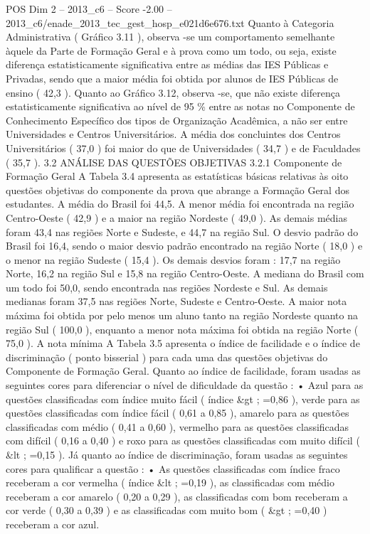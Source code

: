 \begin{textsample}{POS Dim 2 – 2013\_c6 – Score -2.00 – 2013\_c6/enade\_2013\_tec\_gest\_hosp\_e021d6e676.txt}
Quanto à Categoria Administrativa ( Gráfico 3.11 ), observa -se um comportamento semelhante àquele da Parte de Formação Geral e à prova como um todo, ou seja, existe diferença estatisticamente significativa entre as médias das IES Públicas e Privadas, sendo que a maior média foi obtida por alunos de IES Públicas de ensino ( 42,3 ).
Quanto ao Gráfico 3.12, observa -se, que não existe diferença estatisticamente significativa ao nível de 95 \% entre as notas no Componente de Conhecimento Específico dos tipos de Organização Acadêmica, a não ser entre Universidades e Centros Universitários.
A média dos concluintes dos Centros Universitários ( 37,0 ) foi maior do que de Universidades ( 34,7 ) e de Faculdades ( 35,7 ). 3.2 ANÁLISE DAS QUESTÕES OBJETIVAS 3.2.1 Componente de Formação Geral A Tabela 3.4 apresenta as estatísticas básicas relativas às oito questões objetivas do componente da prova que abrange a Formação Geral dos estudantes.
A média do Brasil foi 44,5.
A menor média foi encontrada na região Centro-Oeste ( 42,9 ) e a maior na região Nordeste ( 49,0 ).
As demais médias foram 43,4 nas regiões Norte e Sudeste, e 44,7 na região Sul.
O desvio padrão do Brasil foi 16,4, sendo o maior desvio padrão encontrado na região Norte ( 18,0 ) e o menor na região Sudeste ( 15,4 ).
Os demais desvios foram : 17,7 na região Norte, 16,2 na região Sul e 15,8 na região Centro-Oeste.
A mediana do Brasil com um todo foi 50,0, sendo encontrada nas regiões Nordeste e Sul.
As demais medianas foram 37,5 nas regiões Norte, Sudeste e Centro-Oeste.
A maior nota máxima foi obtida por pelo menos um aluno tanto na região Nordeste quanto na região Sul ( 100,0 ), enquanto a menor nota máxima foi obtida na região Norte ( 75,0 ).
A nota mínima A Tabela 3.5 apresenta o índice de facilidade e o índice de discriminação ( ponto bisserial ) para cada uma das questões objetivas do Componente de Formação Geral.
Quanto ao índice de facilidade, foram usadas as seguintes cores para diferenciar o nível de dificuldade da questão : • Azul para as questões classificadas com índice muito fácil ( índice \&gt ; =0,86 ), verde para as questões classificadas com índice fácil ( 0,61 a 0,85 ), amarelo para as questões classificadas com médio ( 0,41 a 0,60 ), vermelho para as questões classificadas com difícil ( 0,16 a 0,40 ) e roxo para as questões classificadas com muito difícil ( \&lt ; =0,15 ).
Já quanto ao índice de discriminação, foram usadas as seguintes cores para qualificar a questão : • As questões classificadas com índice fraco receberam a cor vermelha ( índice \&lt ; =0,19 ), as classificadas com médio receberam a cor amarelo ( 0,20 a 0,29 ), as classificadas com bom receberam a cor verde ( 0,30 a 0,39 ) e as classificadas com muito bom ( \&gt ; =0,40 ) receberam a cor azul.

\end{textsample}
